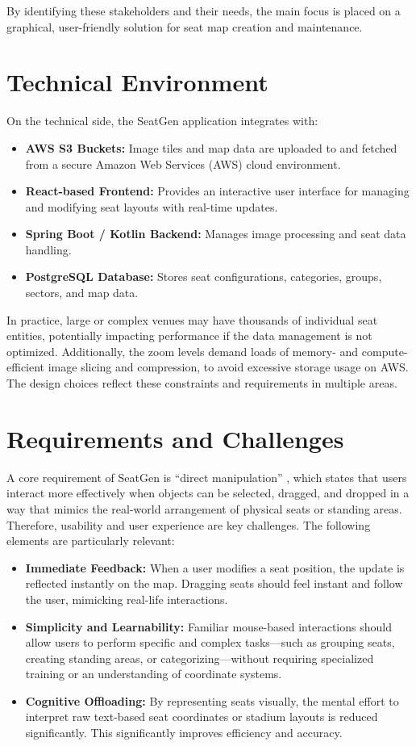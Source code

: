 By identifying these stakeholders and their needs, the main focus is placed on a graphical, user-friendly solution for seat map creation and maintenance.

\section{Technical Environment}
On the technical side, the SeatGen application integrates with:
\begin{itemize}
    \item \textbf{AWS S3 Buckets:} Image tiles and map data are uploaded to and fetched from a secure Amazon Web Services (AWS) cloud environment.
    \item \textbf{React-based Frontend:} Provides an interactive user interface for managing and modifying seat layouts with real-time updates.  
    \item \textbf{Spring Boot / Kotlin Backend:} Manages image processing and seat data handling.  
    \item \textbf{PostgreSQL Database:} Stores seat configurations, categories, groups, sectors, and map data.  
\end{itemize}

In practice, large or complex venues may have thousands of individual seat entities, potentially impacting performance if the data management is not optimized. Additionally, the zoom levels demand loads of memory- and compute-efficient image slicing and compression, to avoid excessive storage usage on AWS. The design choices reflect these constraints and requirements in multiple areas.

\section{Requirements and Challenges}
A core requirement of SeatGen is “direct manipulation” \cite{Hutchins01121985}, which states that users interact more effectively when objects can be selected, dragged, and dropped in a way that mimics the real-world arrangement of physical seats or standing areas. Therefore, usability and user experience are key challenges. The following elements are particularly relevant:

\begin{itemize}
    \item \textbf{Immediate Feedback:} When a user modifies a seat position, the update is reflected instantly on the map. Dragging seats should feel instant and follow the user, mimicking real-life interactions.
    \item \textbf{Simplicity and Learnability:} Familiar mouse-based interactions should allow users to perform specific and complex tasks—such as grouping seats, creating standing areas, or categorizing—without requiring specialized training or an understanding of coordinate systems.
    \item \textbf{Cognitive Offloading:} By representing seats visually, the mental effort to interpret raw text-based seat coordinates or stadium layouts is reduced significantly. This significantly improves efficiency and accuracy.
\end{itemize}


